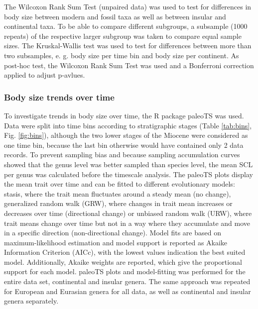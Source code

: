 The Wilcoxon Rank Sum Test (unpaired data) was used to test for differences in body size between modern and fossil taxa as well as between insular and continental taxa. To be able to compare different subgroups, a subsample (1000 repeats) of the respective larger subgroup was taken to compare equal sample sizes.
The Kruskal-Wallis test was used to test for differences between more than two subsamples, e. g. body size per time bin and body size per continent.
As post-hoc test, the Wilcoxon Rank Sum Test was used and a Bonferroni correction applied  to adjust p-avlues.



\subsubsection{Body size trends over time}
To investigate trends in body size over time, the R package paleoTS \citep{Hunt2015a} was used. Data were split into time bins according to stratigraphic stages (Table \ref{tab:bins}, Fig. \ref{fig:bins}), although the two lower stages of the Miocene were considered as one time bin, because the last bin otherwise would have contained only 2 data records. To prevent sampling bias and because sampling accumulation curves showed that the genus level was better sampled than species level, the mean SCL per genus was calculated before the timescale analysis. The paleoTS plots display the mean trait over time and can be fitted to different evolutionary models: stasis, where the trait mean fluctuates around a steady mean (no change), generalized random walk (GRW), where changes in trait mean increases or decreases over time (directional change) or unbiased random walk (URW), where trait means change over time but not in a way where they accumulate and move in a specific direction (non-directional change). Model fits are based on maximum-likelihood estimation and model support is reported as Akaike Information Criterion (AICc), with the lowest values indication the best suited model. Additionally, Akaike weights are reported, which give the proportional support for each model. paleoTS plots and model-fitting was performed for the entire data set, continental and insular genera. The same approach was repeated for European and Eurasian genera for all data, as well as continental and insular genera separately.





